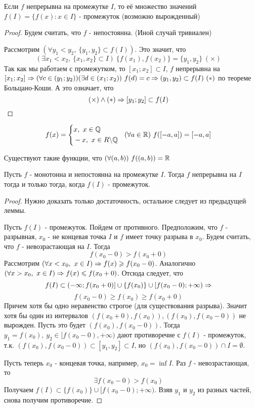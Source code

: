 \begin{lemma}
	Если $f$ непрерывна на промежутке $I$, то её множество
	значений $f(I) = \{f(x) : x \in I\}$ - промежуток (возможно
	вырожденный)
\end{lemma}

\begin{proof}
	Будем считать, что $f$ - непостоянна.
	(Иной случай тривиален)
	
	Рассмотрим $(\forall y_1 < y_2,\ \{y_1, y_2\}
	\subset f(I))$.
	Это значит, что
	\[
		(\exists x_1 < x_2,\ \{x_1, x_2\} \subset I)
		\ \{f(x_1), f(x_2)\} = \{y_1, y_2\}\ (\times)
	\]
	Так как мы работаем с промежутком, то $[x_1; x_2]
	\subset I$, $f$ непрерывна на $[x_1; x_2] \Rightarrow
	(\forall c \in (y_1; y_2))(\exists d \in (x_1; x_2))
	\ f(d) = c \Rightarrow (y_1, y_2) \subset f(I)\ (*)$ по теореме
	Больцано-Коши. А это означает, что
	\[
		(\times)\wedge(*) \Rightarrow [y_1; y_2] \subset f(I)
	\]
\end{proof}

\begin{example}
	\[
		f(x) = \left\{\begin{aligned}
			&x,\ x \in \mathbb{Q} \\
			&-x,\ x \in R \backslash \mathbb{Q}
		\end{aligned}\right.
		\ \ (\forall a \in \mathbb{R})\ f([-a, a]) = [-a, a]
	\]
\end{example}

\begin{note}
	Существуют такие функции, что $(\forall (a, b))\ f((a, b)) = \mathbb{R}$
\end{note}

\begin{lemma} \label{for_back}
	Пусть $f$ - монотонна и непостоянна на промежутке $I$. Тогда $f$
	непрерывна на $I$ тогда и только тогда, когда $f(I)$ -
	промежуток.
\end{lemma}

\begin{proof}
	Нужно доказать только достаточность, остальное следует
	из предыдущей леммы.
	
	Пусть $f(I)$ - промежуток. Пойдем от противного. Предположим, что $f$ -
	разрывная, $x_0$ - не концевая точка $I$ и $f$ имеет точку
	разрыва в $x_0$. Будем считать, что $f$ - невозрастающая на $I$.
	Тогда
	\[
		f(x_0 - 0) > f(x_0 + 0)
	\]
	Рассмотрим $(\forall x < x_0,\ x \in I) \Rightarrow f(x) \geqslant f(x_0 - 0)$.
	Аналогично $(\forall x > x_0,\ x \in I) \Rightarrow f(x) \leqslant f(x_0 + 0)$.
	Отсюда следует, что
	\[
		f(I) \subset (-\infty; f(x_0 + 0)]
		\cup \{f(x_0)\} \cup [f(x_0 - 0); +\infty) \Rightarrow
	\]
	\[
		f(x_0 - 0) \ge f(x_0) \ge f(x_0 + 0)
	\]
	Причем хотя бы одно неравенство строгое (для существования
	разрыва). Значит хотя бы один из интервалов
	$(f(x_0 + 0), f(x_0)), (f(x_0), f(x_0 - 0))$ не вырожден.
	Пусть это будет $(f(x_0), f(x_0 - 0))$. Тогда $y_1 
	= f(x_0),\ y_2 \in [f(x_0 - 0), +\infty)$ дают противоречие
	с $f(I)$ - промежуток, т.к. $(f(x_0), f(x_0 - 0)) \subset 
	[y_1, y_2] \subset I$, но $(f(x_0), f(x_0 - 0)) \cap I
	= \emptyset$.
	
	Пусть теперь $x_0$ - концевая точка, например,
	$x_0 = \inf I$. Раз $f$ - невозрастающая, то
	\[
		\exists f(x_0 - 0) > f(x_0)
	\]
	Получаем $f(I) \subset \{f(x_0)\} \cup [f(x_0 - 0); +\infty)$. Взяв $y_1$ и $y_2$ из разных частей, снова получим противоречие.
\end{proof}

